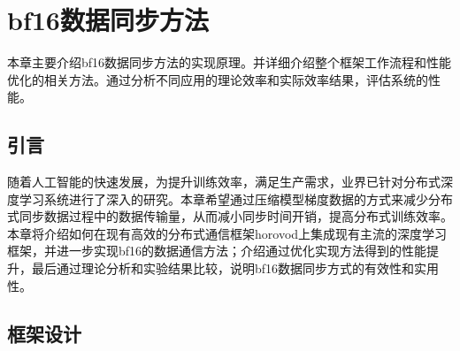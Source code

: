 \chapter{bf16数据同步方法}
本章主要介绍bf16数据同步方法的实现原理。并详细介绍整个框架工作流程和性能优化的相关方法。通过分析不同应用的理论效率和实际效率结果，评估系统的性能。
\section{引言}
随着人工智能的快速发展，为提升训练效率，满足生产需求，业界已针对分布式深度学习系统进行了深入的研究。本章希望通过压缩模型梯度数据的方式来减少分布式同步数据过程中的数据传输量，从而减小同步时间开销，提高分布式训练效率。本章将介绍如何在现有高效的分布式通信框架horovod上集成现有主流的深度学习框架，并进一步实现bf16的数据通信方法；介绍通过优化实现方法得到的性能提升，最后通过理论分析和实验结果比较，说明bf16数据同步方式的有效性和实用性。
\section{框架设计}
